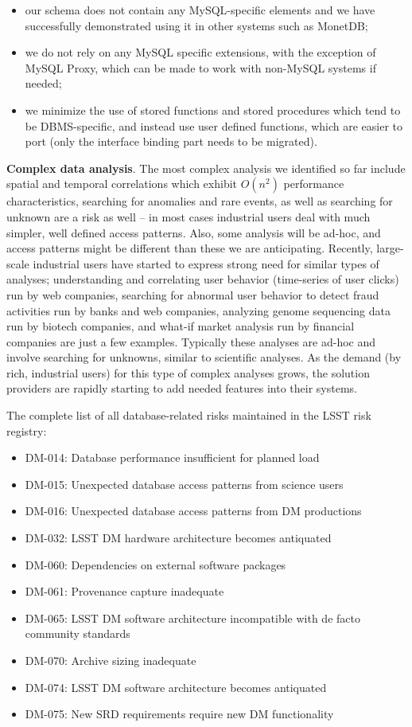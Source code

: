 \documentclass[DM,lsstdraft,toc]{lsstdoc}
\begin{document}
\begin{itemize}
\item
  our schema does not contain any MySQL-specific elements and we have
  successfully demonstrated using it in other systems such as MonetDB;
\item
  we do not rely on any MySQL specific extensions, with the exception of
  MySQL Proxy, which can be made to work with non-MySQL systems if
  needed;
\item
  we minimize the use of stored functions and stored procedures which
  tend to be DBMS-specific, and instead use user defined functions,
  which are easier to port (only the interface binding part needs to be
  migrated).
\end{itemize}

\textbf{Complex data analysis}. The most complex analysis we identified
so far include spatial and temporal correlations which exhibit
\(O(n^2)\) performance characteristics, searching for anomalies and rare
events, as well as searching for unknown are a risk as well -- in most
cases industrial users deal with much simpler, well defined access
patterns. Also, some analysis will be ad-hoc, and access patterns might
be different than these we are anticipating. Recently, large-scale
industrial users have started to express strong need for similar types of
analyses; understanding and correlating user behavior (time-series of
user clicks) run by web companies, searching for abnormal user behavior
to detect fraud activities run by banks and web companies, analyzing
genome sequencing data run by biotech companies, and what-if market
analysis run by financial companies are just a few examples. Typically
these analyses are ad-hoc and involve searching for unknowns, similar to
scientific analyses. As the demand (by rich, industrial users) for this
type of complex analyses grows, the solution providers are rapidly
starting to add needed features into their systems.

The complete list of all database-related risks maintained in the LSST
risk registry:

\begin{itemize}
\item
  DM-014: Database performance insufficient for planned load
\item
  DM-015: Unexpected database access patterns from science users
\item
  DM-016: Unexpected database access patterns from DM productions
\item
  DM-032: LSST DM hardware architecture becomes antiquated
\item
  DM-060: Dependencies on external software packages
\item
  DM-061: Provenance capture inadequate
\item
  DM-065: LSST DM software architecture incompatible with de facto
  community standards
\item
  DM-070: Archive sizing inadequate
\item
  DM-074: LSST DM software architecture becomes antiquated
\item
  DM-075: New SRD requirements require new DM functionality
\end{itemize}
\end{document}
